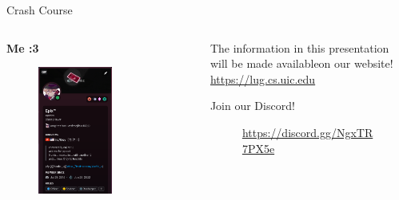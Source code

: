 \documentclass{beamer}
\begin{document}
\begin{frame}{Crash Course}
	\begin{columns}
		\begin{column}{0.5\textwidth}
			\textbf{Me :3}
			\begin{figure}
				\centering
				\includegraphics[width=0.60\textwidth]{epixtm.png}
			\end{figure}
		\end{column}
		\begin{column}{0.5\textwidth}
			The information in this presentation will be made
			available\footnotemark on our website!\\
			\url{https://lug.cs.uic.edu}
			
			\bigskip
			Join our Discord!

			\begin{figure}
				\centering
				
				\caption{\url{https://discord.gg/NgxTR7PX5e}}
			\end{figure}
		\end{column}
	\end{columns}

\end{frame}
\end{document}
